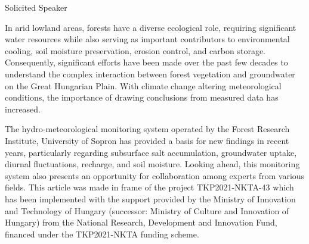 {}
\begin{flushleft}

{\Large Solicited Speaker \bigskip}







\end{flushleft}

\noindent

In arid lowland areas, forests have a diverse ecological role, requiring significant water resources while also serving as important contributors to environmental cooling, soil moisture preservation, erosion control, and carbon storage. Consequently, significant efforts have been made over the past few decades to understand the complex interaction between forest vegetation and groundwater on the Great Hungarian Plain. With climate change altering meteorological conditions, the importance of drawing conclusions from measured data has increased. 

The hydro-meteorological monitoring system operated by the Forest Research Institute, University of Sopron has provided a basis for new findings in recent years, particularly regarding subsurface salt accumulation, groundwater uptake, diurnal fluctuations, recharge, and soil moisture. Looking ahead, this monitoring system also presents an opportunity for collaboration among experts from various fields.
This article was made in frame of the project TKP2021-NKTA-43 which has been implemented with the support provided by the Ministry of Innovation and Technology of Hungary (successor: Ministry of Culture and Innovation of Hungary) from the National Research, Development and Innovation Fund, financed under the TKP2021-NKTA funding scheme.

